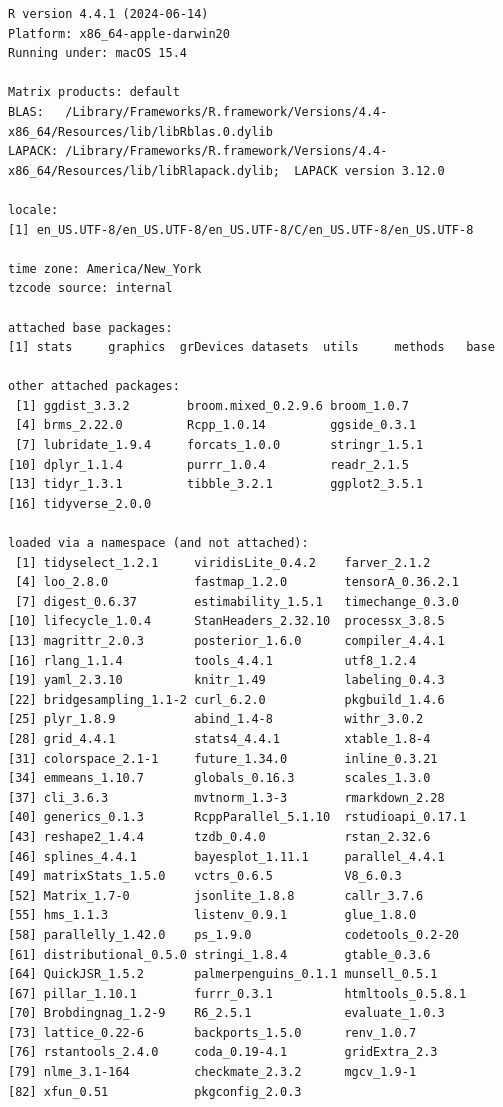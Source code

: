 \documentclass[
  letterpaper,
  DIV=11,
  numbers=noendperiod]{scrartcl}
\begin{document}
\begin{verbatim}
R version 4.4.1 (2024-06-14)
Platform: x86_64-apple-darwin20
Running under: macOS 15.4

Matrix products: default
BLAS:   /Library/Frameworks/R.framework/Versions/4.4-x86_64/Resources/lib/libRblas.0.dylib 
LAPACK: /Library/Frameworks/R.framework/Versions/4.4-x86_64/Resources/lib/libRlapack.dylib;  LAPACK version 3.12.0

locale:
[1] en_US.UTF-8/en_US.UTF-8/en_US.UTF-8/C/en_US.UTF-8/en_US.UTF-8

time zone: America/New_York
tzcode source: internal

attached base packages:
[1] stats     graphics  grDevices datasets  utils     methods   base     

other attached packages:
 [1] ggdist_3.3.2        broom.mixed_0.2.9.6 broom_1.0.7        
 [4] brms_2.22.0         Rcpp_1.0.14         ggside_0.3.1       
 [7] lubridate_1.9.4     forcats_1.0.0       stringr_1.5.1      
[10] dplyr_1.1.4         purrr_1.0.4         readr_2.1.5        
[13] tidyr_1.3.1         tibble_3.2.1        ggplot2_3.5.1      
[16] tidyverse_2.0.0    

loaded via a namespace (and not attached):
 [1] tidyselect_1.2.1     viridisLite_0.4.2    farver_2.1.2        
 [4] loo_2.8.0            fastmap_1.2.0        tensorA_0.36.2.1    
 [7] digest_0.6.37        estimability_1.5.1   timechange_0.3.0    
[10] lifecycle_1.0.4      StanHeaders_2.32.10  processx_3.8.5      
[13] magrittr_2.0.3       posterior_1.6.0      compiler_4.4.1      
[16] rlang_1.1.4          tools_4.4.1          utf8_1.2.4          
[19] yaml_2.3.10          knitr_1.49           labeling_0.4.3      
[22] bridgesampling_1.1-2 curl_6.2.0           pkgbuild_1.4.6      
[25] plyr_1.8.9           abind_1.4-8          withr_3.0.2         
[28] grid_4.4.1           stats4_4.4.1         xtable_1.8-4        
[31] colorspace_2.1-1     future_1.34.0        inline_0.3.21       
[34] emmeans_1.10.7       globals_0.16.3       scales_1.3.0        
[37] cli_3.6.3            mvtnorm_1.3-3        rmarkdown_2.28      
[40] generics_0.1.3       RcppParallel_5.1.10  rstudioapi_0.17.1   
[43] reshape2_1.4.4       tzdb_0.4.0           rstan_2.32.6        
[46] splines_4.4.1        bayesplot_1.11.1     parallel_4.4.1      
[49] matrixStats_1.5.0    vctrs_0.6.5          V8_6.0.3            
[52] Matrix_1.7-0         jsonlite_1.8.8       callr_3.7.6         
[55] hms_1.1.3            listenv_0.9.1        glue_1.8.0          
[58] parallelly_1.42.0    ps_1.9.0             codetools_0.2-20    
[61] distributional_0.5.0 stringi_1.8.4        gtable_0.3.6        
[64] QuickJSR_1.5.2       palmerpenguins_0.1.1 munsell_0.5.1       
[67] pillar_1.10.1        furrr_0.3.1          htmltools_0.5.8.1   
[70] Brobdingnag_1.2-9    R6_2.5.1             evaluate_1.0.3      
[73] lattice_0.22-6       backports_1.5.0      renv_1.0.7          
[76] rstantools_2.4.0     coda_0.19-4.1        gridExtra_2.3       
[79] nlme_3.1-164         checkmate_2.3.2      mgcv_1.9-1          
[82] xfun_0.51            pkgconfig_2.0.3     
\end{verbatim}
\end{document}
